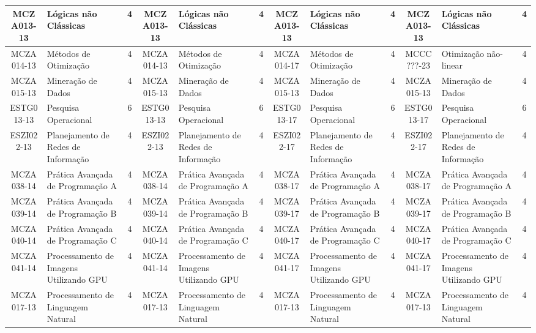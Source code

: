 \documentclass[a4paper]{article}
\begin{document}
\begin{landscape}
{\begin{longtable}{|c|p{.2\textheight}|c||c|p{.2\textheight}|c||c|p{.2\textheight}|c||c|p{.2\textheight}|c|}
MCZA013-13 & Lógicas não Clássicas & 4 &
MCZA013-13 & Lógicas não Clássicas & 4 &
MCZA013-13 & Lógicas não Clássicas & 4 &
MCZA013-13 & Lógicas não Clássicas & 4\\ \hline

MCZA014-13 & Métodos de Otimização & 4 &
MCZA014-13 & Métodos de Otimização & 4 &
MCZA014-17 & Métodos de Otimização & 4 &
MCCC???-23 & Otimização não-linear & 4\\ \hline

MCZA015-13 & Mineração de Dados & 4 &
MCZA015-13 & Mineração de Dados & 4 &
MCZA015-13 & Mineração de Dados & 4 &
MCZA015-13 & Mineração de Dados & 4\\ \hline

ESTG013-13 & Pesquisa Operacional & 6 &
ESTG013-13 & Pesquisa Operacional & 6 &
ESTG013-17 & Pesquisa Operacional & 6 &
ESTG013-17 & Pesquisa Operacional & 6\\ \hline

ESZI022-13 & Planejamento de Redes de Informação & 4 &
ESZI022-13 & Planejamento de Redes de Informação & 4 &
ESZI022-17 & Planejamento de Redes de Informação & 4 &
ESZI022-17 & Planejamento de Redes de Informação & 4\\ \hline

MCZA038-14 & Prática Avançada de Programação A & 4 &
MCZA038-14 & Prática Avançada de Programação A & 4 &
MCZA038-17 & Prática Avançada de Programação A & 4 &
MCZA038-17 & Prática Avançada de Programação A & 4\\ \hline

MCZA039-14 & Prática Avançada de Programação B & 4 &
MCZA039-14 & Prática Avançada de Programação B & 4 &
MCZA039-17 & Prática Avançada de Programação B & 4 & 
MCZA039-17 & Prática Avançada de Programação B & 4\\ \hline

MCZA040-14 & Prática Avançada de Programação C & 4 &
MCZA040-14 & Prática Avançada de Programação C & 4 &
MCZA040-17 & Prática Avançada de Programação C & 4 &
MCZA040-17 & Prática Avançada de Programação C & 4\\ \hline

MCZA041-14 & Processamento de Imagens Utilizando GPU & 4 &
MCZA041-14 & Processamento de Imagens Utilizando GPU & 4 &
MCZA041-17 & Processamento de Imagens Utilizando GPU & 4 & 
MCZA041-17 & Processamento de Imagens Utilizando GPU & 4\\ \hline

MCZA017-13 & Processamento de Linguagem Natural & 4 &
MCZA017-13 & Processamento de Linguagem Natural & 4 &
MCZA017-13 & Processamento de Linguagem Natural & 4 &
MCZA017-13 & Processamento de Linguagem Natural & 4\\ \hline


\end{longtable}}
\end{landscape}
\end{document}
